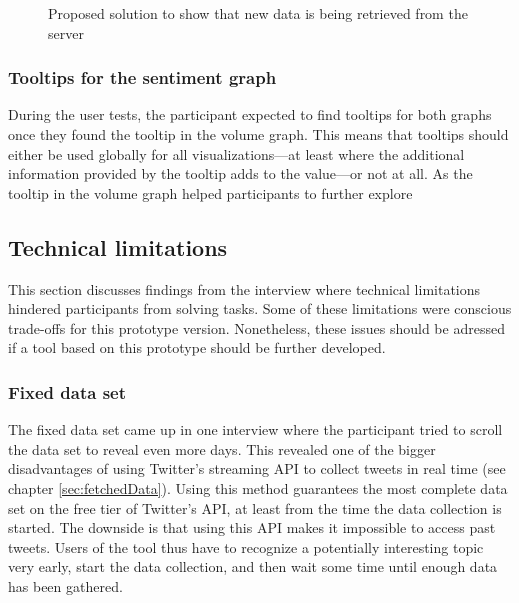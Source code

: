\begin{figure}[htbp]
    \caption{Proposed solution to show that new data is being retrieved from the server}
    \label{fig:fetching_state}
\end{figure}

\subsubsection*{Tooltips for the sentiment graph}
During the user tests, the participant expected to find tooltips for both graphs once they found the tooltip in the volume graph. This means that tooltips should either be used globally for all visualizations---at least where the additional information provided by the tooltip adds to the value---or not at all. As the tooltip in the volume graph helped participants to further explore 

\subsection{Technical limitations}
This section discusses findings from the interview where technical limitations hindered participants from solving tasks. Some of these limitations were conscious trade-offs for this prototype version. Nonetheless, these issues should be adressed if a tool based on this prototype should be further developed.

\subsubsection*{Fixed data set}
The fixed data set came up in one interview where the participant tried to scroll the data set to reveal even more days. This revealed one of the bigger disadvantages of using Twitter's streaming API to collect tweets in real time (see chapter \ref{sec:fetchedData}). Using this method guarantees the most complete data set on the free tier of Twitter's API, at least from the time the data collection is started. The downside is that using this API makes it impossible to access past tweets. Users of the tool thus have to recognize a potentially interesting topic very early, start the data collection, and then wait some time until enough data has been gathered.

